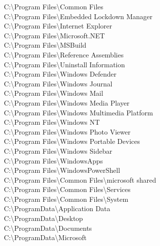 \noindent C:\textbackslash Program Files\textbackslash Common Files \\
C:\textbackslash Program Files\textbackslash Embedded Lockdown Manager \\
C:\textbackslash Program Files\textbackslash Internet Explorer \\
C:\textbackslash Program Files\textbackslash Microsoft.NET \\
C:\textbackslash Program Files\textbackslash MSBuild \\
C:\textbackslash Program Files\textbackslash Reference Assemblies \\
C:\textbackslash Program Files\textbackslash Uninstall Information \\
C:\textbackslash Program Files\textbackslash Windows Defender \\
C:\textbackslash Program Files\textbackslash Windows Journal \\
C:\textbackslash Program Files\textbackslash Windows Mail \\
C:\textbackslash Program Files\textbackslash Windows Media Player \\
C:\textbackslash Program Files\textbackslash Windows Multimedia Platform \\
C:\textbackslash Program Files\textbackslash Windows NT \\
C:\textbackslash Program Files\textbackslash Windows Photo Viewer \\
C:\textbackslash Program Files\textbackslash Windows Portable Devices \\
C:\textbackslash Program Files\textbackslash Windows Sidebar \\
C:\textbackslash Program Files\textbackslash WindowsApps \\
C:\textbackslash Program Files\textbackslash WindowsPowerShell \\
C:\textbackslash Program Files\textbackslash Common Files\textbackslash microsoft shared \\
C:\textbackslash Program Files\textbackslash Common Files\textbackslash Services \\
C:\textbackslash Program Files\textbackslash Common Files\textbackslash System \\
C:\textbackslash ProgramData\textbackslash Application Data \\
C:\textbackslash ProgramData\textbackslash Desktop \\
C:\textbackslash ProgramData\textbackslash Documents \\
C:\textbackslash ProgramData\textbackslash Microsoft \\
